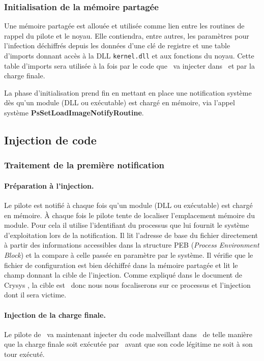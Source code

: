 \subsubsection{Initialisation de la mémoire partagée}
Une mémoire partagée est allouée et utilisée comme lien entre les routines de rappel du pilote et le noyau.
Elle contiendra, entre autres, les paramètres pour l'infection déchiffrés depuis les données d'une clé de registre et une table d'imports donnant accès à la DLL \texttt{kernel.dll} et aux fonctions du noyau.
Cette table d'imports sera utilisée à la fois par le code que \duqu\ va injecter dans \services\ et par la charge finale.

La phase d'initialisation prend fin en mettant en place une notification système dès qu'un module (DLL ou exécutable) est chargé en mémoire, via l'appel système \textbf{PsSetLoadImageNotifyRoutine}.

\FloatBarrier
\subsection{Injection de code}
\subsubsection{Traitement de la première notification}
\paragraph{Préparation à l'injection.}
Le pilote est notifié à chaque fois qu'un module (DLL ou exécutable) est chargé en mémoire.
À chaque fois le pilote tente de localiser l'emplacement mémoire du module.
Pour cela il utilise l'identifiant du processus que lui fournit le système d'exploitation lors de la notification.
Il lit l'adresse de base du fichier directement à partir des informations accessibles dans la structure PEB (\emph{Process Environment Block}) et la compare à celle passée en paramètre par le système.
Il vérifie que le fichier de configuration est bien déchiffré dans la mémoire partagée et lit le champ donnant la cible de l'injection.
Comme expliqué dans le document de Crysys \cite{CrysysDuquStuxnet}, la cible est \services\ donc nous nous focaliserons sur ce processus et l'injection dont il sera victime.

\paragraph{Injection de la charge finale.}
Le pilote de \duqu\ va maintenant injecter du code malveillant dans \services\ de telle manière que la charge finale soit exécutée par \services\ avant que son code légitime ne soit à son tour exécuté.

